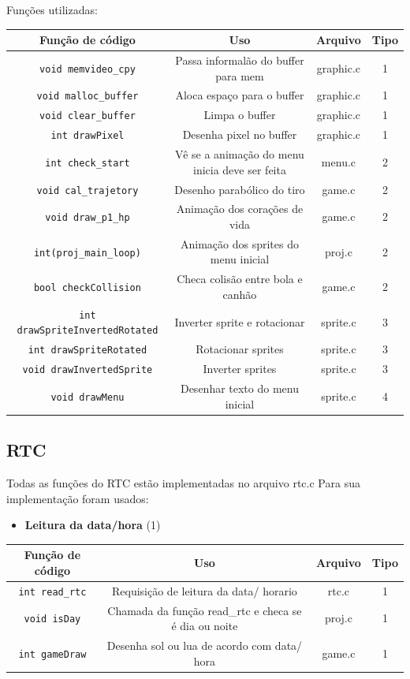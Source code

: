 \documentclass[12pt]{article}
\begin{document}
Funções utilizadas: 
\begin{center}
    \begin{tabular}{|c|c|c|c|}
        \hline
        Função de código& Uso & Arquivo & Tipo\\
        \hline
        \texttt{void memvideo\_cpy} & Passa informalão do buffer para mem & graphic.c & 1 \\
        \texttt{void malloc\_buffer} & Aloca espaço para o buffer & graphic.c & 1\\  
        \texttt{void clear\_buffer} & Limpa o buffer & graphic.c & 1 \\
        \texttt{int drawPixel} & Desenha pixel no buffer & graphic.c & 1 \\ 
        \texttt{int check\_start} & Vê se a animação do menu inicia deve ser feita & menu.c & 2\\
        \texttt{void cal\_trajetory} & Desenho parabólico do tiro & game.c & 2 \\
        \texttt{void draw\_p1\_hp} & Animação dos corações de vida & game.c & 2 \\ 
        \texttt{int(proj\_main\_loop)} & Animação dos sprites do menu inicial & proj.c & 2 \\
        \texttt{bool checkCollision} & Checa colisão entre bola e canhão & game.c & 2\\ 
        \texttt{int drawSpriteInvertedRotated} & Inverter sprite e rotacionar & sprite.c & 3\\
        \texttt{int drawSpriteRotated} & Rotacionar sprites & sprite.c & 3 \\ 
        \texttt{void drawInvertedSprite} & Inverter sprites & sprite.c & 3 \\
        \texttt{void drawMenu} & Desenhar texto do menu inicial & sprite.c & 4 \\ 
        
        \hline
    \end{tabular}
\end{center}

\subsection{RTC}
Todas as funções do RTC estão implementadas no arquivo rtc.c 
Para sua implementação foram usados: 
\begin{itemize}
    \item \textbf{Leitura da data/hora} (1)
\end{itemize}
\begin{center}
    \begin{tabular}{|c|c|c|c|}
        \hline
        Função de código & Uso & Arquivo & Tipo \\ 
        \hline 
        \texttt{int read\_rtc} & Requisição de leitura da data/ horario & rtc.c & 1 \\
        \texttt{void isDay} & Chamada da função read\_rtc e checa se é dia ou noite & proj.c & 1 \\
        \texttt{int gameDraw} & Desenha sol ou lua de acordo com data/ hora & game.c & 1 \\
        \hline
    \end{tabular}
\end{center}
\end{document}
